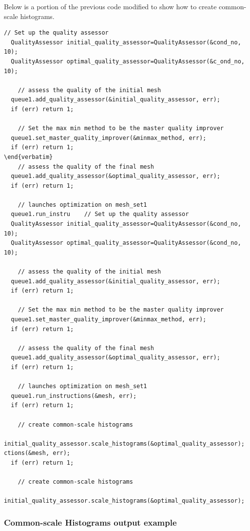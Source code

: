  Below is a portion of the previous code modified to show how to create common-scale histograms.
\begin{lstlisting}[frame=single]
    // Set up the quality assessor
  QualityAssessor initial_quality_assessor=QualityAssessor(&cond_no, 10);
  QualityAssessor optimal_quality_assessor=QualityAssessor(&c_ond_no, 10);

    // assess the quality of the initial mesh
  queue1.add_quality_assessor(&initial_quality_assessor, err); 
  if (err) return 1;

    // Set the max min method to be the master quality improver
  queue1.set_master_quality_improver(&minmax_method, err); 
  if (err) return 1;
\end{verbatim}
    // assess the quality of the final mesh
  queue1.add_quality_assessor(&optimal_quality_assessor, err); 
  if (err) return 1;

    // launches optimization on mesh_set1
  queue1.run_instru    // Set up the quality assessor
  QualityAssessor initial_quality_assessor=QualityAssessor(&cond_no, 10);
  QualityAssessor optimal_quality_assessor=QualityAssessor(&cond_no, 10);

    // assess the quality of the initial mesh
  queue1.add_quality_assessor(&initial_quality_assessor, err); 
  if (err) return 1;

    // Set the max min method to be the master quality improver
  queue1.set_master_quality_improver(&minmax_method, err); 
  if (err) return 1;

    // assess the quality of the final mesh
  queue1.add_quality_assessor(&optimal_quality_assessor, err); 
  if (err) return 1;

    // launches optimization on mesh_set1
  queue1.run_instructions(&mesh, err); 
  if (err) return 1;

    // create common-scale histograms
  initial_quality_assessor.scale_histograms(&optimal_quality_assessor);
ctions(&mesh, err); 
  if (err) return 1;

    // create common-scale histograms
  initial_quality_assessor.scale_histograms(&optimal_quality_assessor);

\end{lstlisting}

\clearpage
\subsubsection{Common-scale Histograms output example}

